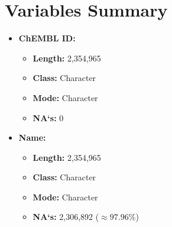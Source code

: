 \documentclass[10pt]{article}
\begin{document}
\section{Variables Summary}
\begin{itemize}
    \item \textbf{ChEMBL ID:}
    \begin{itemize}
        \item \textbf{Length:} 2,354,965
        \item \textbf{Class:} Character
        \item \textbf{Mode:} Character
        \item \textbf{NA`s:} 0
    \end{itemize}
    \item \textbf{Name:}
    \begin{itemize}
        \item \textbf{Length:} 2,354,965
        \item \textbf{Class:} Character
        \item \textbf{Mode:} Character
        \item \textbf{NA`s:} 2,306,892 ($\approx 97.96\% $)
    \end{itemize}


\end{itemize}
\end{document}
